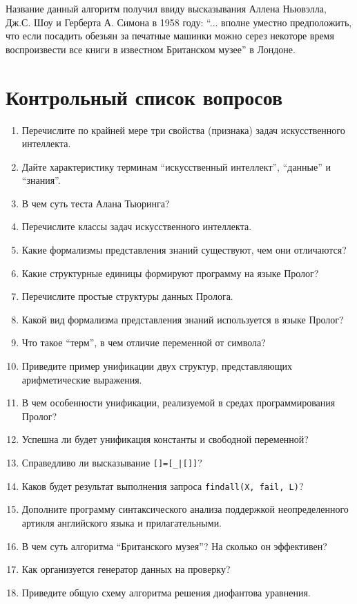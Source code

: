 \documentclass[12pt, openany, twoside]{book} %
\begin{document}
Название данный алгоритм получил ввиду высказывания Аллена Ньювэлла, Дж.С. Шоу и Герберта А. Симона в 1958 году: ``... вполне уместно предположить, что если посадить обезьян за печатные машинки можно серез некоторе время воспроизвести все книги в известном Британском музее'' в Лондоне.


\chapter*{Контрольный список вопросов}
\begin{enumerate}
\item{} Перечислите по крайней мере три свойства (признака) задач искусственного интеллекта.
\item{} Дайте характеристику терминам ``искусственный интеллект'', ``данные'' и ``знания''.
\item{} В чем суть теста Алана Тьюринга?
\item{} Перечислите классы задач искусственного интеллекта.
\item{} Какие формализмы представления знаний существуют, чем они отличаются?
\item{} Какие структурные единицы формируют программу на языке Пролог?
\item{} Перечислите простые структуры данных Пролога.
\item{} Какой вид формализма представления знаний используется в языке Пролог?
\item{} Что такое ``терм'', в чем отличие переменной от символа?
\item{} Приведите пример унификации двух структур, представляющих арифметические выражения.
\item{} В чем особенности унификации, реализуемой в средах программирования Пролог?
\item{} Успешна ли будет унификация константы и свободной переменной?
\item{} Справедливо ли высказывание \texttt{[]=[\_|[]]}?
\item{} Каков будет результат выполнения запроса \texttt{findall(X, fail, L)}?
\item{} Дополните программу синтаксического анализа поддержкой неопределенного артикля английского языка и прилагательными.
\item{} В чем суть алгоритма ``Британского музея''? На сколько он эффективен?
\item{} Как организуется генератор данных на проверку?
\item{} Приведите общую схему алгоритма решения диофантова уравнения.

\end{enumerate}
\end{document}
